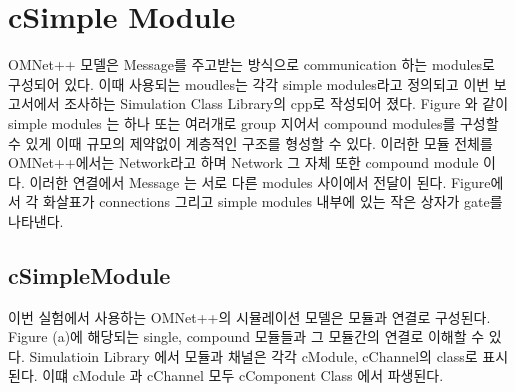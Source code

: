 \section{cSimple Module}
OMNet++ 모델은 Message를 주고받는 방식으로 communication 하는 modules로 구성되어 있다. 이때 사용되는 moudles는 각각 simple modules라고 정의되고 이번 보고서에서 조사하는 Simulation Class Library의 cpp로 작성되어 졌다. Figure 와 같이 simple modules 는 하나 또는 여러개로 group 지어서 compound modules를 구성할 수 있게 이때 규모의 제약없이 계층적인 구조를 형성할 수 있다. 이러한 모듈 전체를 OMNet++에서는 Network라고 하며 Network 그 자체 또한 compound module 이다.  이러한 연결에서 Message 는 서로 다른 modules 사이에서 전달이 된다. Figure에서 각 화살표가 connections 그리고 simple modules 내부에 있는 작은 상자가 gate를 나타낸다.\\
\vspace{-6mm}
\begin{figure}[h!]
\centering
{}\hspace{5mm}
\end{figure}

\vspace{-6mm}
\subsection*{cSimpleModule}
이번 실험에서 사용하는 OMNet++의 시뮬레이션 모델은 모듈과 연결로 구성된다. Figure (a)에 해당되는 single, compound 모듈들과 그 모듈간의 연결로 이해할 수 있다.
Simulatioin Library 에서 모듈과 채널은 각각 cModule, cChannel의 class로 표시된다. 이떄 cModule 과 cChannel 모두 cComponent Class 에서 파생된다.

